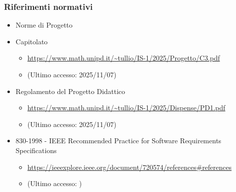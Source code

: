 \documentclass[a4paper,12pt]{article}
\begin{document}
{{            \subsubsection{Riferimenti normativi} {
                \begin{itemize}
                    \item Norme di Progetto
                    \item \hypertarget{capitolato}{Capitolato}
                    \begin{itemize}
                        \item {\url{https://www.math.unipd.it/~tullio/IS-1/2025/Progetto/C3.pdf}}
                        \item[] (Ultimo accesso: 2025/11/07)
                    \end{itemize}
                    \item Regolamento del Progetto Didattico
                    \begin{itemize}
                        \item \url{https://www.math.unipd.it/~tullio/IS-1/2025/Dispense/PD1.pdf}
                        \item[] (Ultimo accesso: 2025/11/07)
                    \end{itemize}
                    \item 830-1998 - IEEE Recommended Practice for Software Requirements Specifications
                    \begin{itemize}
                        \item \url{https://ieeexplore.ieee.org/document/720574/references#references}
                        \item[] (Ultimo accesso: )
                    \end{itemize}
                \end{itemize}
            }
}}
\end{document}
